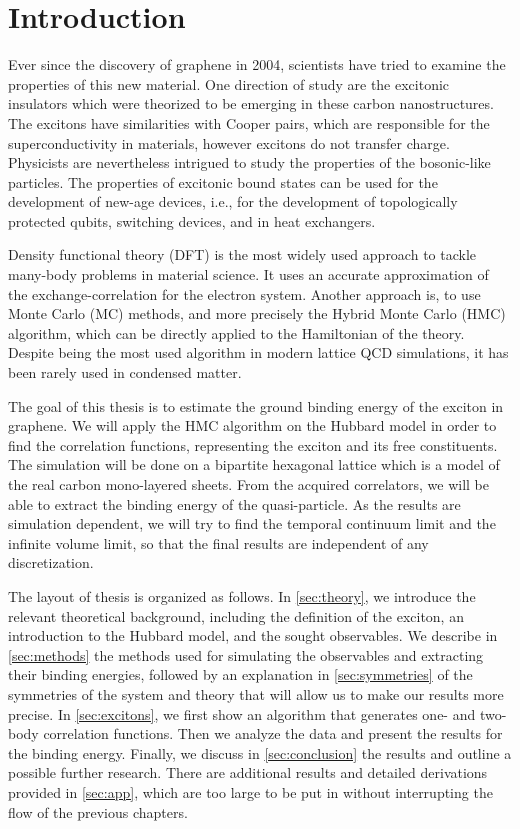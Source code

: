 
\chapter{Introduction}
\label{sec:intro}

Ever since the discovery of graphene in 2004, scientists have tried to examine the properties of this new material. One direction of study are the excitonic insulators which were theorized to be emerging in these carbon nanostructures. The excitons have similarities with Cooper pairs, which are responsible for the superconductivity in materials, however excitons do not transfer charge. Physicists are nevertheless intrigued to study the properties of the bosonic-like particles. The properties of excitonic bound states can be used for the development of new-age devices, i.e., for the development of topologically protected qubits, switching devices, and in heat exchangers.

Density functional theory (DFT) is the most widely used approach to tackle many-body problems in material science. It uses an accurate approximation of the exchange-correlation for the electron system. Another approach is, to use Monte Carlo (MC) methods, and more precisely the Hybrid Monte Carlo (HMC) algorithm, which can be directly applied to the Hamiltonian of the theory. Despite being the most used algorithm in modern lattice  QCD simulations, it has been rarely used in condensed matter.

The goal of this thesis is to estimate the ground binding energy of the exciton in graphene. We will apply the HMC algorithm on the Hubbard model in order to find the correlation functions, representing the exciton and its free constituents. The simulation will be done on a bipartite hexagonal lattice which is a model of the real carbon mono-layered sheets. From the acquired correlators, we will be able to extract the binding energy of the quasi-particle. As the results are simulation dependent, we will try to find the temporal continuum limit and the infinite volume limit, so that the final results are independent of any discretization.

The layout of thesis is organized as follows. In \cref{sec:theory}, we introduce the relevant theoretical background, including the definition of the exciton, an introduction to the Hubbard model, and the sought observables. We describe in \cref{sec:methods} the methods used for simulating the observables and extracting their binding energies, followed by an explanation in \cref{sec:symmetries} of the symmetries of the system and theory that will allow us to make our results more precise. In \cref{sec:excitons}, we first show an algorithm that generates one- and two-body correlation functions. Then we analyze the data and present the results for the binding energy. Finally, we discuss in \cref{sec:conclusion} the results and outline a possible further research. There are additional results and detailed derivations provided in \cref{sec:app}, which are too large to be put in without interrupting the flow of the previous chapters.

